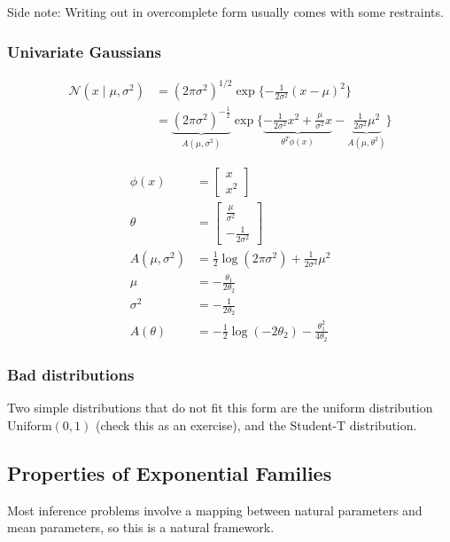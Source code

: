 \documentclass{article}
\begin{document}
Side note: Writing out in overcomplete form usually comes with some restraints.

\subsubsection{Univariate Gaussians}

\begin{align*}
\mathcal{N} ( x \mid \mu, \sigma^2) &= (2 \pi \sigma^2)^{1/2} \exp \{ -\frac{1}{2\sigma^2} (x - \mu)^2 \} \\
&= \underbrace{(2\pi \sigma^2)^{-\frac{1}{2}}}_{A(\mu, \sigma^2)} \exp\{\underbrace{-\frac{1}{2\sigma^2}x^2 + \frac{\mu}{\sigma^2}x}_{\theta^T \phi(x)} - \underbrace{\frac{1}{2\sigma^2} \mu^2}_{A(\mu, \theta^2)}\}
\end{align*}

\begin{align*}
\phi(x) &= \begin{bmatrix} x \\ x^2 \end{bmatrix} \\
\theta &= \begin{bmatrix} \frac{\mu}{\sigma^2} \\ -\frac{1}{2\sigma^2} \end{bmatrix}\\
A(\mu, \sigma^2) &= \frac{1}{2}\log(2\pi\sigma^2) + \frac{1}{2\sigma^2}\mu^2
\\
\mu &= - \frac{\theta_1}{2\theta_2}
\\
\sigma^2 &= - \frac{1}{2\theta_2}
\\
A(\theta) &= - \frac12 \log( -2 \theta_2) - \frac{\theta_1^2}{4 \theta_2}
\end{align*}

\subsubsection{Bad distributions}
Two simple distributions that do not fit this form are the uniform distribution $\text{Uniform}(0,1)$ (check this as an exercise), and the Student-T distribution.

\subsection{Properties of Exponential Families}
Most inference problems involve a mapping between natural parameters and mean parameters, so this is a natural framework. 
\end{document}
